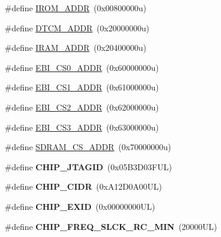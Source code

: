 \begin{DoxyCompactItemize}
\item 
\#define \mbox{\hyperlink{group__SAMV71J19__definitions_ga694212ffb8c2786bacee3d0ad6020bda}{I\+R\+O\+M\+\_\+\+A\+D\+DR}}~(0x00800000u)
\item 
\#define \mbox{\hyperlink{group__SAMV71J19__definitions_ga26626a425f7ebb3a0c2dbc276f0d9f78}{D\+T\+C\+M\+\_\+\+A\+D\+DR}}~(0x20000000u)
\item 
\#define \mbox{\hyperlink{group__SAMV71J19__definitions_gaae45ac2ef16942159481c767ac4805cf}{I\+R\+A\+M\+\_\+\+A\+D\+DR}}~(0x20400000u)
\item 
\#define \mbox{\hyperlink{group__SAMV71J19__definitions_ga9bcbb97ddae3b2cc5e2c9613d33f66b4}{E\+B\+I\+\_\+\+C\+S0\+\_\+\+A\+D\+DR}}~(0x60000000u)
\item 
\#define \mbox{\hyperlink{group__SAMV71J19__definitions_gaaddd9fdbbc77c9aced5308819f502a26}{E\+B\+I\+\_\+\+C\+S1\+\_\+\+A\+D\+DR}}~(0x61000000u)
\item 
\#define \mbox{\hyperlink{group__SAMV71J19__definitions_ga058a35f9991487dc2dd12ada792d0730}{E\+B\+I\+\_\+\+C\+S2\+\_\+\+A\+D\+DR}}~(0x62000000u)
\item 
\#define \mbox{\hyperlink{group__SAMV71J19__definitions_gad66ebdd0fc33ec3cf85dbaa14bbf05d9}{E\+B\+I\+\_\+\+C\+S3\+\_\+\+A\+D\+DR}}~(0x63000000u)
\item 
\#define \mbox{\hyperlink{group__SAMV71J19__definitions_ga61b7db25daf759c2a2beb6e5a0b57a84}{S\+D\+R\+A\+M\+\_\+\+C\+S\+\_\+\+A\+D\+DR}}~(0x70000000u)
\item 
\mbox{\label{group__SAMV71J19__definitions_gaa614519778eec0df55d3eeab3223e3f6}} 
\#define {\bfseries C\+H\+I\+P\+\_\+\+J\+T\+A\+G\+ID}~(0x05\+B3\+D03\+F\+U\+L)
\item 
\mbox{\label{group__SAMV71J19__definitions_ga1e1ae44dd9269a8a98c1d7e7a60e9fbd}} 
\#define {\bfseries C\+H\+I\+P\+\_\+\+C\+I\+DR}~(0x\+A12\+D0\+A00\+U\+L)
\item 
\mbox{\label{group__SAMV71J19__definitions_ga35123717aa86b76bb6b73cf3adc4c2e6}} 
\#define {\bfseries C\+H\+I\+P\+\_\+\+E\+X\+ID}~(0x00000000\+U\+L)
\item 
\mbox{\label{group__SAMV71J19__definitions_ga0e868bf27426399dfdcb3a9dfc3733c4}} 
\#define {\bfseries C\+H\+I\+P\+\_\+\+F\+R\+E\+Q\+\_\+\+S\+L\+C\+K\+\_\+\+R\+C\+\_\+\+M\+IN}~(20000\+U\+L)

\end{DoxyCompactItemize}
